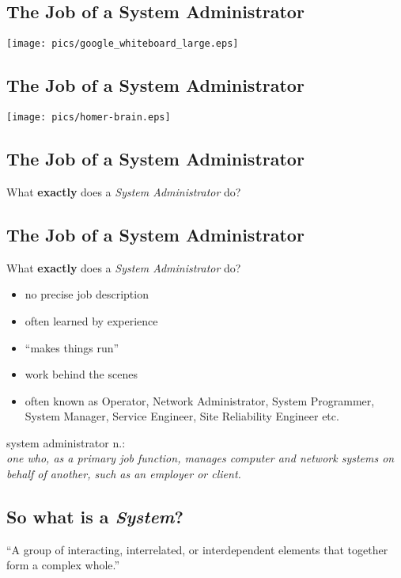 \documentclass[xga]{xdvislides}
\begin{document}
\subsection{The Job of a System Administrator}
\vspace*{\fill}
\begin{center}
	\texttt{[image: pics/google\_whiteboard\_large.eps]} \\
\end{center}
\vspace*{\fill}

\subsection{The Job of a System Administrator}
\vspace*{\fill}
\begin{center}
	\texttt{[image: pics/homer-brain.eps]} \\
\end{center}
\vspace*{\fill}

\subsection{The Job of a System Administrator}
What {\bf exactly} does a {\em System Administrator} do?

\subsection{The Job of a System Administrator}
What {\bf exactly} does a {\em System Administrator} do?
\begin{itemize}
	\item no precise job description
	\item often learned by experience
	\item ``makes things run''
	\item work behind the scenes
	\item often known as Operator, Network Administrator, System Programmer, System
		Manager, Service Engineer, Site Reliability Engineer etc.
\end{itemize}
\vfill
system administrator n.: \\
{\em one who, as a primary job function,
	manages computer and network systems on behalf of another, such as an
	employer or client.}

\subsection{So what is a {\em System}?}
``A group of interacting, interrelated, or interdependent elements that
together form a complex whole.''
\end{document}
